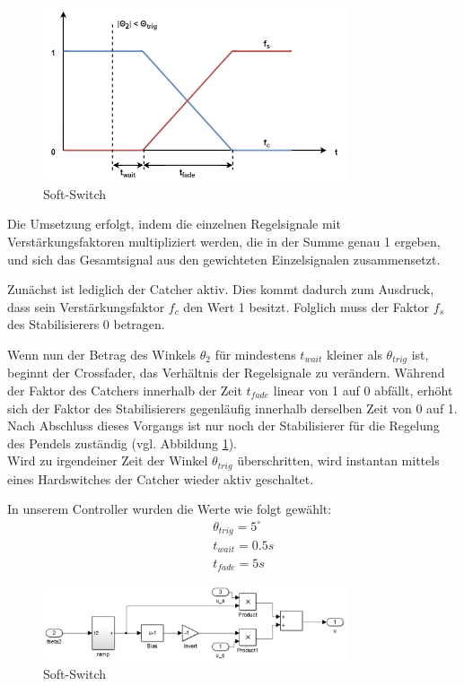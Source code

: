 \begin{figure}[htbp]
	\centering	
	\label{fig.Soft-Switch}
	\includegraphics[width=0.8\textwidth]{Grafiken/SoftSwitch.png}
	\caption{Soft-Switch}
\end{figure}

Die Umsetzung erfolgt, indem die einzelnen Regelsignale mit Verstärkungsfaktoren multipliziert werden, die in der Summe genau 1 ergeben, und sich das Gesamtsignal aus den gewichteten Einzelsignalen zusammensetzt.

Zunächst ist lediglich der Catcher aktiv. Dies kommt dadurch zum Ausdruck, dass sein Verstärkungsfaktor $f_c$ den Wert 1 besitzt. Folglich muss der Faktor $f_s$ des Stabilisierers 0 betragen.

Wenn nun der Betrag des Winkels $\theta_2$ für mindestens $t_{wait}$ kleiner als $\theta_{trig}$ ist, beginnt der Crossfader, das Verhältnis der Regelsignale zu verändern.
Während der Faktor des Catchers innerhalb der Zeit $t_{fade}$ linear von 1 auf 0 abfällt, erhöht sich der Faktor des Stabilisierers gegenläufig innerhalb derselben Zeit von 0 auf 1.
Nach Abschluss dieses Vorgangs ist nur noch der Stabilisierer für die Regelung des Pendels zuständig (vgl. Abbildung \ref{fig.Soft-Switch}). \\

Wird zu irgendeiner Zeit der Winkel $\theta_{trig}$ überschritten, wird instantan mittels eines Hardswitches der Catcher wieder aktiv geschaltet.

In unserem Controller wurden die Werte wie folgt gewählt:
\begin{eqnarray*}
&& \theta_{trig} = 5^{\circ} \\
&& t_{wait} = 0.5 s \\
&& t_{fade} = 5 s
\end{eqnarray*}

\begin{figure}[htbp]
	\centering	
	\label{fig.Simu_Soft-Switch}
	\includegraphics[width=0.8\textwidth]{Grafiken/simulink_softswitch.png}
	\caption{Soft-Switch}
\end{figure}

